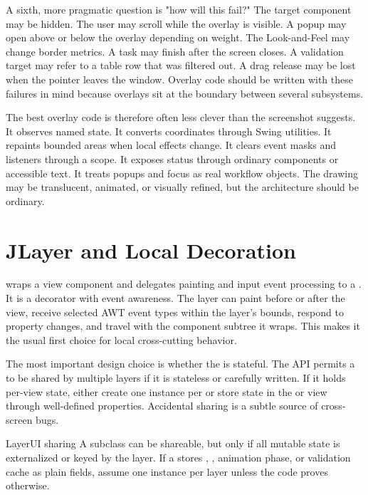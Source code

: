 A sixth, more pragmatic question is "how will this fail?" The target component
may be hidden. The user may scroll while the overlay is visible. A popup may
open above or below the overlay depending on weight. The Look-and-Feel may
change border metrics. A task may finish after the screen closes. A validation
target may refer to a table row that was filtered out. A drag release may be
lost when the pointer leaves the window. Overlay code should be written with
these failures in mind because overlays sit at the boundary between several
subsystems.

The best overlay code is therefore often less clever than the screenshot
suggests. It observes named state. It converts coordinates through Swing
utilities. It repaints bounded areas when local effects change. It clears event
masks and listeners through a scope. It exposes status through ordinary
components or accessible text. It treats popups and focus as real workflow
objects. The drawing may be translucent, animated, or visually refined, but the
architecture should be ordinary.

\section{JLayer and Local Decoration}

 wraps a view component and delegates painting and input event processing to a . It is a decorator with event awareness. The layer can paint before or after the view, receive selected AWT event types within the layer's bounds, respond to property changes, and travel with the component subtree it wraps. This makes it the usual first choice for local cross-cutting behavior.

The most important design choice is whether the  is stateful. The API permits a  to be shared by multiple layers if it is stateless or carefully written. If it holds per-view state, either create one instance per  or store state in the  or view through well-defined properties. Accidental sharing is a subtle source of cross-screen bugs.

\begin{detailbox}{LayerUI sharing}
A  subclass can be shareable, but only if all mutable state is externalized or keyed by the layer. If a  stores , , animation phase, or validation cache as plain fields, assume one instance per layer unless the code proves otherwise.
\end{detailbox}

